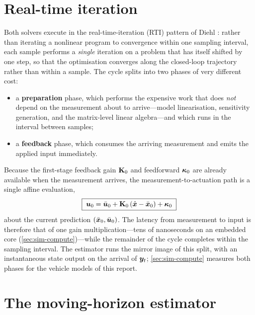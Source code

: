 \section{Real-time iteration}
\label{sec:rti}

Both solvers execute in the real-time-iteration (RTI) pattern of Diehl
\etal \cite{diehl2005realtime,gros2020linear}: rather than iterating a
nonlinear program to convergence within one sampling interval, each sample
performs a \emph{single} iteration on a problem that has itself shifted by one
step, so that the optimisation converges along the closed-loop trajectory rather
than within a sample. The cycle splits into two phases of very different cost:

\begin{itemize}[nosep,leftmargin=1.4em]
  \item a \textbf{preparation} phase, which performs the expensive work that
        does \emph{not} depend on the measurement about to arrive---model
        linearisation, sensitivity generation, and the matrix-level linear
        algebra---and which runs in the interval between samples;
  \item a \textbf{feedback} phase, which consumes the arriving measurement and
        emits the applied input immediately.
\end{itemize}

Because the first-stage feedback gain $\mathbf{K}_0$ and feedforward
$\bm{\kappa}_0$ are already available when the measurement arrives, the
measurement-to-actuation path is a single affine evaluation,
\begin{equation}
\boxed{\;\bm{u}_0=\bar{\bm{u}}_0+\mathbf{K}_0\,(\hat{\bm{x}}-\bar{\bm{x}}_0)+\bm{\kappa}_0\;}
\label{eq:rti-feedback}
\end{equation}
about the current prediction $(\bar{\bm{x}}_0,\bar{\bm{u}}_0)$. The latency from
measurement to input is therefore that of one gain multiplication---tens of
nanoseconds on an embedded core (\cref{sec:sim-compute})---while the remainder of the
cycle completes within the sampling interval. The estimator runs the mirror
image of this split, with an instantaneous state output on the arrival of
$\bm{y}_t$; \cref{sec:sim-compute} measures both phases for the vehicle models of
this report.

\section{The moving-horizon estimator}
\label{sec:mhe}


